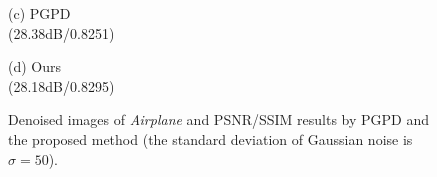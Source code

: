 \documentclass[runningheads]{llncs}
\begin{document}
\begin{figure}
{\begin{minipage}[t]{0.244\textwidth}
{\footnotesize (c) PGPD \\(28.38dB/0.8251)}
\end{minipage}
\begin{minipage}[t]{0.244\textwidth}
\centering
{}
{\footnotesize (d) Ours \\(28.18dB/0.8295)}
\end{minipage}
}
\caption{Denoised images of \textsl{Airplane} and PSNR/SSIM results by PGPD and the proposed method (the standard deviation of Gaussian noise is $\sigma=50$).}
\label{fig27}
\end{figure}
\end{document}

